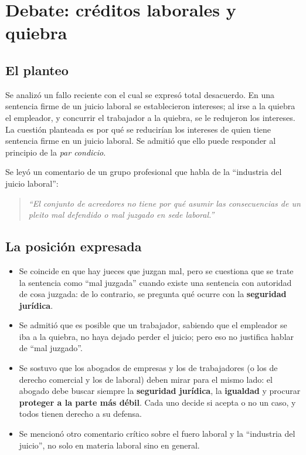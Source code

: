 \documentclass[12pt,oneside]{book}
\begin{document}
\section{Debate: créditos laborales y quiebra}

\subsection{El planteo}

Se analizó un fallo reciente con el cual se expresó total desacuerdo. En una sentencia firme de un juicio laboral se establecieron intereses; al irse a la quiebra el empleador, y concurrir el trabajador a la quiebra, se le redujeron los intereses. La cuestión planteada es por qué se reducirían los intereses de quien tiene sentencia firme en un juicio laboral. Se admitió que ello puede responder al principio de la \textit{par condicio}.

Se leyó un comentario de un grupo profesional que habla de la ``industria del juicio laboral'':

\begin{quote}
\textit{``El conjunto de acreedores no tiene por qué asumir las consecuencias de un pleito mal defendido o mal juzgado en sede laboral.''}
\end{quote}

\subsection{La posición expresada}

\begin{itemize}
    \item Se coincide en que hay jueces que juzgan mal, pero se cuestiona que se trate la sentencia como ``mal juzgada'' cuando existe una sentencia con autoridad de cosa juzgada: de lo contrario, se pregunta qué ocurre con la \textbf{seguridad jurídica}.
    \item Se admitió que es posible que un trabajador, sabiendo que el empleador se iba a la quiebra, no haya dejado perder el juicio; pero eso no justifica hablar de ``mal juzgado''.
    \item Se sostuvo que los abogados de empresas y los de trabajadores (o los de derecho comercial y los de laboral) deben mirar para el mismo lado: el abogado debe buscar siempre la \textbf{seguridad jurídica}, la \textbf{igualdad} y procurar \textbf{proteger a la parte más débil}. Cada uno decide si acepta o no un caso, y todos tienen derecho a su defensa.
    \item Se mencionó otro comentario crítico sobre el fuero laboral y la ``industria del juicio'', no solo en materia laboral sino en general.
\end{itemize}
\end{document}
